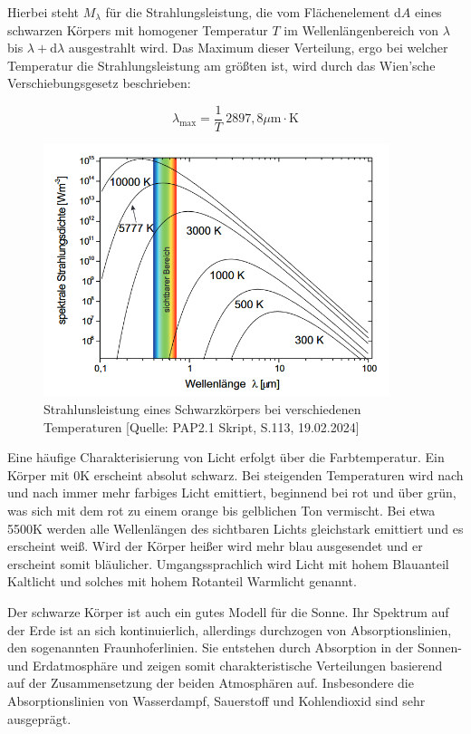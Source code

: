 \documentclass{article}
\begin{document}
Hierbei steht $M_{\lambda}$ für die Strahlungsleistung, die vom Flächenelement d$A$ eines schwarzen Körpers mit homogener Temperatur $T$ im Wellenlängenbereich von $\lambda$ bis $\lambda + \text{d}\lambda$ ausgestrahlt wird. Das Maximum dieser Verteilung, ergo bei welcher Temperatur die Strahlungsleistung am größten ist, wird durch das Wien'sche Verschiebungsgesetz beschrieben:

\begin{equation}
    \lambda_{\text{max}} = \frac{1}{T} \ 2897,8 \mu \text{m} \cdot \text{K}
    \label{eq:wien}
\end{equation}

\begin{figure}[!h]
    \centering
    \includegraphics[width=0.9\textwidth]{graphics/bb.png}
    \caption{Strahlunsleistung eines Schwarzkörpers bei verschiedenen Temperaturen [Quelle: PAP2.1 Skript, S.113, 19.02.2024]}
    \label{fig:bbstrahlung}
\end{figure}

Eine häufige Charakterisierung von Licht erfolgt über die Farbtemperatur. Ein Körper mit 0K erscheint absolut schwarz. Bei steigenden Temperaturen wird nach und nach immer mehr farbiges Licht emittiert, beginnend bei rot und über grün, was sich mit dem rot zu einem orange bis gelblichen Ton vermischt. Bei etwa 5500K werden alle Wellenlängen des sichtbaren Lichts gleichstark emittiert und es erscheint weiß. Wird der Körper heißer wird mehr blau ausgesendet und er erscheint somit bläulicher. Umgangssprachlich wird Licht mit hohem Blauanteil Kaltlicht und solches mit hohem Rotanteil Warmlicht genannt.

Der schwarze Körper ist auch ein gutes Modell für die Sonne. Ihr Spektrum auf der Erde ist an sich kontinuierlich, allerdings durchzogen von Absorptionslinien, den sogenannten Fraunhoferlinien. Sie entstehen durch Absorption in der Sonnen- und Erdatmosphäre und zeigen somit charakteristische Verteilungen basierend auf der Zusammensetzung der beiden Atmosphären auf. Insbesondere die Absorptionslinien von Wasserdampf, Sauerstoff und Kohlendioxid sind sehr ausgeprägt. 
\end{document}
